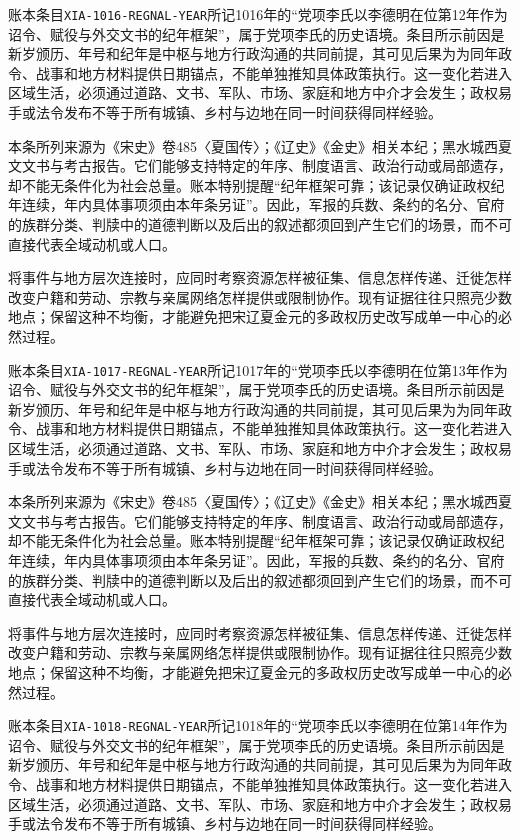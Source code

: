 账本条目\texttt{XIA-1016-REGNAL-YEAR}所记1016年的“党项李氏以李德明在位第12年作为诏令、赋役与外交文书的纪年框架”，属于党项李氏的历史语境。条目所示前因是新岁颁历、年号和纪年是中枢与地方行政沟通的共同前提，其可见后果为为同年政令、战事和地方材料提供日期锚点，不能单独推知具体政策执行。这一变化若进入区域生活，必须通过道路、文书、军队、市场、家庭和地方中介才会发生；政权易手或法令发布不等于所有城镇、乡村与边地在同一时间获得同样经验。

本条所列来源为《宋史》卷485〈夏国传〉；《辽史》《金史》相关本纪；黑水城西夏文文书与考古报告。它们能够支持特定的年序、制度语言、政治行动或局部遗存，却不能无条件化为社会总量。账本特别提醒“纪年框架可靠；该记录仅确证政权纪年连续，年内具体事项须由本年条另证”。因此，军报的兵数、条约的名分、官府的族群分类、判牍中的道德判断以及后出的叙述都须回到产生它们的场景，而不可直接代表全域动机或人口。

将事件与地方层次连接时，应同时考察资源怎样被征集、信息怎样传递、迁徙怎样改变户籍和劳动、宗教与亲属网络怎样提供或限制协作。现有证据往往只照亮少数地点；保留这种不均衡，才能避免把宋辽夏金元的多政权历史改写成单一中心的必然过程。

账本条目\texttt{XIA-1017-REGNAL-YEAR}所记1017年的“党项李氏以李德明在位第13年作为诏令、赋役与外交文书的纪年框架”，属于党项李氏的历史语境。条目所示前因是新岁颁历、年号和纪年是中枢与地方行政沟通的共同前提，其可见后果为为同年政令、战事和地方材料提供日期锚点，不能单独推知具体政策执行。这一变化若进入区域生活，必须通过道路、文书、军队、市场、家庭和地方中介才会发生；政权易手或法令发布不等于所有城镇、乡村与边地在同一时间获得同样经验。

本条所列来源为《宋史》卷485〈夏国传〉；《辽史》《金史》相关本纪；黑水城西夏文文书与考古报告。它们能够支持特定的年序、制度语言、政治行动或局部遗存，却不能无条件化为社会总量。账本特别提醒“纪年框架可靠；该记录仅确证政权纪年连续，年内具体事项须由本年条另证”。因此，军报的兵数、条约的名分、官府的族群分类、判牍中的道德判断以及后出的叙述都须回到产生它们的场景，而不可直接代表全域动机或人口。

将事件与地方层次连接时，应同时考察资源怎样被征集、信息怎样传递、迁徙怎样改变户籍和劳动、宗教与亲属网络怎样提供或限制协作。现有证据往往只照亮少数地点；保留这种不均衡，才能避免把宋辽夏金元的多政权历史改写成单一中心的必然过程。

账本条目\texttt{XIA-1018-REGNAL-YEAR}所记1018年的“党项李氏以李德明在位第14年作为诏令、赋役与外交文书的纪年框架”，属于党项李氏的历史语境。条目所示前因是新岁颁历、年号和纪年是中枢与地方行政沟通的共同前提，其可见后果为为同年政令、战事和地方材料提供日期锚点，不能单独推知具体政策执行。这一变化若进入区域生活，必须通过道路、文书、军队、市场、家庭和地方中介才会发生；政权易手或法令发布不等于所有城镇、乡村与边地在同一时间获得同样经验。

